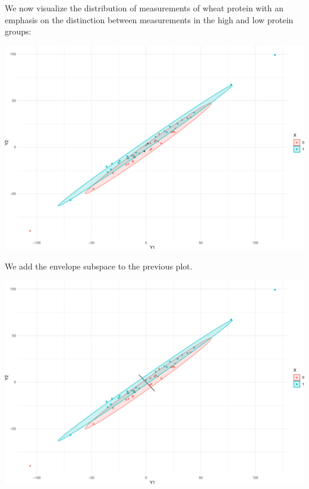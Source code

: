 \documentclass[
  ignorenonframetext,
]{beamer}
\begin{document}
\begin{frame}{}
\protect\hypertarget{section-2}{}
We now visualize the distribution of measurements of wheat protein with
an emphasis on the distinction between measurements in the high and low
protein groups:

\vspace{12pt}

\includegraphics{week15_p2_files/figure-beamer/unnamed-chunk-3-1.pdf}
\end{frame}

\begin{frame}{}
\protect\hypertarget{section-3}{}
We add the envelope subspace to the previous plot.

\vspace{12pt}

\includegraphics{week15_p2_files/figure-beamer/unnamed-chunk-4-1.pdf}
\end{frame}
\end{document}
